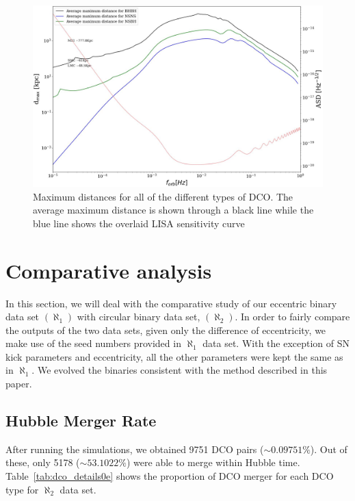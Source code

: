 \documentclass[journal, twocolumn]{IEEEtran}
\begin{document}
    \begin{figure}
        \centering
        \includegraphics[width=\linewidth]{images/DMAX}
        \caption{Maximum distances for all of the different types of DCO. The average maximum distance is
        shown through a black line while the blue line shows the overlaid LISA sensitivity curve}
        \label{fig:dmax}
    \end{figure}


    \section{Comparative analysis}
    \label{sec:comparative-analysis}
    In this section, we will deal with the comparative study of our eccentric binary data set $(\aleph_1)$ with circular binary data set, $(\aleph_2)$.
    In order to fairly compare the outputs of the two data sets, given only the difference of eccentricity, we make use of the seed numbers provided in $\aleph_1$ data set.
    With the exception of SN kick parameters and eccentricity, all the other parameters were kept the same as in $\aleph_1$.
    We evolved the binaries consistent with the method described in this paper.
    
    \subsection{Hubble Merger Rate} 
    After running the simulations, we obtained 9751 DCO pairs ($\sim0.09751\%$). Out of these, only 5178 ($\sim53.1022\%$) were able to merge within Hubble time. Table~\ref{tab:dco_details0e} shows the proportion of DCO merger for each DCO type for $\aleph_2$ data set.
    
\end{document}
